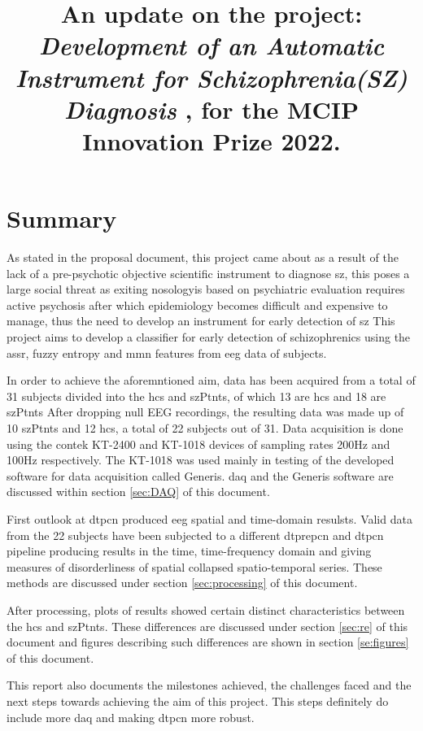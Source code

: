 \documentclass[10pt]{article}
\title{
  An update on the project: 
  \textbf{
      \textit{
        Development of an Automatic Instrument for Schizophrenia(SZ) Diagnosis
        }
      }, for the MCIP Innovation Prize 2022.
  }
\begin{document}
\maketitle

\section{Summary}\label{sec:summary}
  As stated in the proposal document, this project came about as a result 
  of the lack of a pre-psychotic objective scientific instrument to diagnose 
  \gls{sz}, this poses a large social threat as exiting nosologyis based 
  on psychiatric evaluation requires active psychosis after which epidemiology 
  becomes difficult and expensive to manage, thus the need to develop 
  an instrument for early detection of \gls{sz} This project aims to 
  develop a classifier for early detection of schizophrenics using the 
  \gls{assr}, fuzzy entropy and \gls{mmn}
  features from \gls{eeg} data of subjects. 

  In order to achieve the aforemntioned aim, data has been acquired 
  from a total of 31 subjects divided into the \glspl{hc} and \glspl{szPtnt}, 
  of which 13 are \glspl{hc} and 18 are \glspl{szPtnt} 
  After dropping null EEG recordings, the resulting data was made up of 10 
  \glspl{szPtnt} and 12 \glspl{hc}, a total of 22 subjects out of 31. Data 
  acquisition is done using the contek KT-2400 and KT-1018 devices of 
  sampling rates 200Hz and 100Hz respectively. The KT-1018 was used mainly 
  in testing of the developed software for data acquisition called Generis. 
  \Gls{daq} and the Generis software are discussed within section \ref{sec:DAQ} 
  of this document.
  

  First outlook at \gls{dtpcn} produced \gls{eeg} spatial and time-domain 
  resulsts. Valid data from the 22 subjects have been subjected to a different 
  \gls{dtprepcn} and \gls{dtpcn} pipeline producing results in the time, 
  time-frequency domain and giving measures of disorderliness of spatial 
  collapsed spatio-temporal series. These methods are discussed under section 
  \ref{sec:processing} of this document.

  After processing, plots of results showed certain distinct characteristics 
  between the \glspl{hc} and \glspl{szPtnt}. These differences 
  are discussed under section \ref{sec:re} of this document and 
  figures describing such differences are shown in section \ref{se:figures} of 
  this document.

  This report also documents the milestones achieved, the challenges faced and 
  the next steps towards achieving the aim of this project. This steps definitely 
  do include more \gls{daq} and making \gls{dtpcn} more robust.
\end{document}
